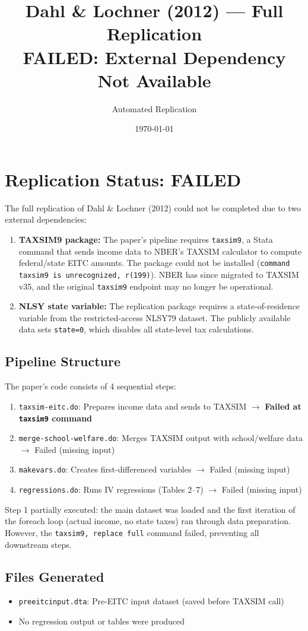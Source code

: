 \documentclass[11pt]{article}
\title{Dahl \& Lochner (2012) --- Full Replication\\
\large FAILED: External Dependency Not Available}
\author{Automated Replication}
\date{\today}
\begin{document}
\maketitle

\section*{Replication Status: FAILED}

The full replication of Dahl \& Lochner (2012) could not be completed due to two external dependencies:

\begin{enumerate}
    \item \textbf{TAXSIM9 package:} The paper's pipeline requires \texttt{taxsim9}, a Stata command that sends income data to NBER's TAXSIM calculator to compute federal/state EITC amounts. The package could not be installed (\texttt{command taxsim9 is unrecognized, r(199)}). NBER has since migrated to TAXSIM v35, and the original \texttt{taxsim9} endpoint may no longer be operational.

    \item \textbf{NLSY state variable:} The replication package requires a state-of-residence variable from the restricted-access NLSY79 dataset. The publicly available data sets \texttt{state=0}, which disables all state-level tax calculations.
\end{enumerate}

\subsection*{Pipeline Structure}

The paper's code consists of 4 sequential steps:
\begin{enumerate}
    \item \texttt{taxsim-eitc.do}: Prepares income data and sends to TAXSIM $\rightarrow$ \textbf{Failed at \texttt{taxsim9} command}
    \item \texttt{merge-school-welfare.do}: Merges TAXSIM output with school/welfare data $\rightarrow$ Failed (missing input)
    \item \texttt{makevars.do}: Creates first-differenced variables $\rightarrow$ Failed (missing input)
    \item \texttt{regressions.do}: Runs IV regressions (Tables 2--7) $\rightarrow$ Failed (missing input)
\end{enumerate}

Step 1 partially executed: the main dataset was loaded and the first iteration of the foreach loop (actual income, no state taxes) ran through data preparation. However, the \texttt{taxsim9, replace full} command failed, preventing all downstream steps.

\subsection*{Files Generated}
\begin{itemize}
    \item \texttt{preeitcinput.dta}: Pre-EITC input dataset (saved before TAXSIM call)
    \item No regression output or tables were produced
\end{itemize}
\end{document}
